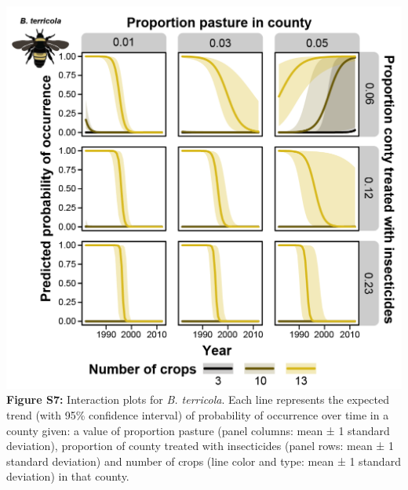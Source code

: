 \documentclass[11pt,]{article}
\begin{document}
\includegraphics[width=1\textwidth,height=\textheight]{../ms_figs/fig_s7.png}
\textbf{Figure S7:} Interaction plots for \emph{B. terricola}. Each line
represents the expected trend (with 95\% confidence interval) of
probability of occurrence over time in a county given: a value of
proportion pasture (panel columns: mean ± 1 standard deviation),
proportion of county treated with insecticides (panel rows: mean ± 1
standard deviation) and number of crops (line color and type: mean ± 1
standard deviation) in that county. \clearpage

\newpage
\end{document}
